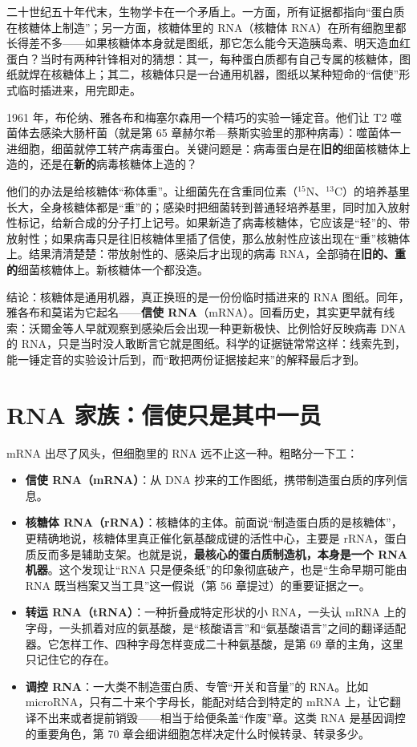 \begin{zhengju}
二十世纪五十年代末，生物学卡在一个矛盾上。一方面，所有证据都指向“蛋白质在核糖体上制造”；另一方面，核糖体里的 RNA（核糖体 RNA）在所有细胞里都长得差不多——如果核糖体本身就是图纸，那它怎么能今天造胰岛素、明天造血红蛋白？当时有两种针锋相对的猜想：其一，每种蛋白质都有自己专属的核糖体，图纸就焊在核糖体上；其二，核糖体只是一台通用机器，图纸以某种短命的“信使”形式临时插进来，用完即走。

1961 年，布伦纳、雅各布和梅塞尔森用一个精巧的实验一锤定音。他们让 T2 噬菌体去感染大肠杆菌（就是第 65 章赫尔希—蔡斯实验里的那种病毒）：噬菌体一进细胞，细菌就停工转产病毒蛋白。关键问题是：病毒蛋白是在\textbf{旧的}细菌核糖体上造的，还是在\textbf{新的}病毒核糖体上造的？

他们的办法是给核糖体“称体重”。让细菌先在含重同位素（$^{15}\mathrm{N}$、$^{13}\mathrm{C}$）的培养基里长大，全身核糖体都是“重”的；感染时把细菌转到普通轻培养基里，同时加入放射性标记，给新合成的分子打上记号。如果新造了病毒核糖体，它应该是“轻”的、带放射性；如果病毒只是往旧核糖体里插了信使，那么放射性应该出现在“重”核糖体上。结果清清楚楚：带放射性的、感染后才出现的病毒 RNA，全部骑在\textbf{旧的、重的}细菌核糖体上。新核糖体一个都没造。

结论：核糖体是通用机器，真正换班的是一份份临时插进来的 RNA 图纸。同年，雅各布和莫诺为它起名——\textbf{信使 RNA}（mRNA）。回看历史，其实更早就有线索：沃爾金等人早就观察到感染后会出现一种更新极快、比例恰好反映病毒 DNA 的 RNA，只是当时没人敢断言它就是图纸。科学的证据链常常这样：线索先到，能一锤定音的实验设计后到，而“敢把两份证据接起来”的解释最后才到。
\end{zhengju}

\section{RNA 家族：信使只是其中一员}

mRNA 出尽了风头，但细胞里的 RNA 远不止这一种。粗略分一下工：

\begin{itemize}[itemsep=2pt]
\item \textbf{信使 RNA（mRNA）}：从 DNA 抄来的工作图纸，携带制造蛋白质的序列信息。
\item \textbf{核糖体 RNA（rRNA）}：核糖体的主体。前面说“制造蛋白质的是核糖体”，更精确地说，核糖体里真正催化氨基酸成键的活性中心，主要是 rRNA，蛋白质反而多是辅助支架。也就是说，\textbf{最核心的蛋白质制造机，本身是一个 RNA 机器}。这个发现让“RNA 只是便条纸”的印象彻底破产，也是“生命早期可能由 RNA 既当档案又当工具”这一假说（第 56 章提过）的重要证据之一。
\item \textbf{转运 RNA（tRNA）}：一种折叠成特定形状的小 RNA，一头认 mRNA 上的字母，一头抓着对应的氨基酸，是“核酸语言”和“氨基酸语言”之间的翻译适配器。它怎样工作、四种字母怎样变成二十种氨基酸，是第 69 章的主角，这里只记住它的存在。
\item \textbf{调控 RNA}：一大类不制造蛋白质、专管“开关和音量”的 RNA。比如 microRNA，只有二十来个字母长，能配对结合到特定的 mRNA 上，让它翻译不出来或者提前销毁——相当于给便条盖“作废”章。这类 RNA 是基因调控的重要角色，第 70 章会细讲细胞怎样决定什么时候转录、转录多少。
\end{itemize}

